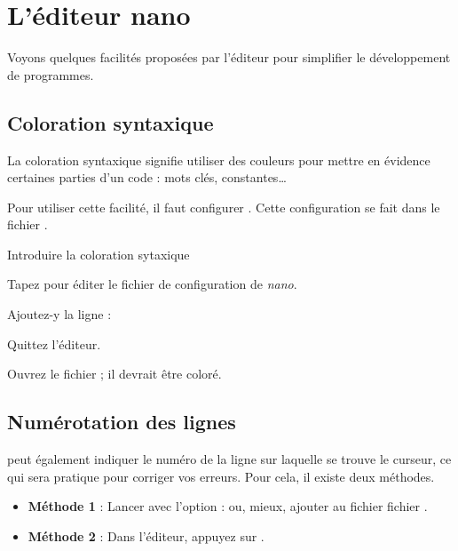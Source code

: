 \documentclass[a4paper,11pt]{style-esi/td}
\begin{document}
\newpage
\section{L'éditeur nano}

	Voyons quelques facilités proposées par l'éditeur 
	pour simplifier le développement de programmes.

	\subsection{Coloration syntaxique}

		La coloration syntaxique signifie 
		utiliser des couleurs pour mettre en évidence certaines parties d'un code :
		mots clés, constantes\ldots
	
		Pour utiliser cette facilité, 
		il faut configurer . 
		Cette configuration se fait dans le fichier .

		\begin{Tutoriel}{Introduire la coloration sytaxique} 
			\vspace{-1em}
			\begin{steps}
			\item 
				Tapez  
				pour éditer le fichier de configuration de \emph{nano}.
			\item 
				Ajoutez-y la ligne : 
			\item 
				Quittez l'éditeur.
			\item 
				Ouvrez le fichier ;
				il devrait être coloré.
			\end{steps}
		\end{Tutoriel}
				
	\subsection{Numérotation des lignes}
				
		 peut également indiquer le numéro de la ligne 
		sur laquelle se trouve 
		le curseur, 
		ce qui sera pratique pour corriger vos erreurs. 
		Pour cela, il existe deux méthodes.

		\begin{itemize}
		\item \textbf{Méthode 1} : 
			Lancer  avec l'option  : 
			ou, mieux, ajouter  au fichier
			fichier .
		\item \textbf{Méthode 2} : 
			Dans l'éditeur, appuyez sur .
		\end{itemize}
		
\end{document}
